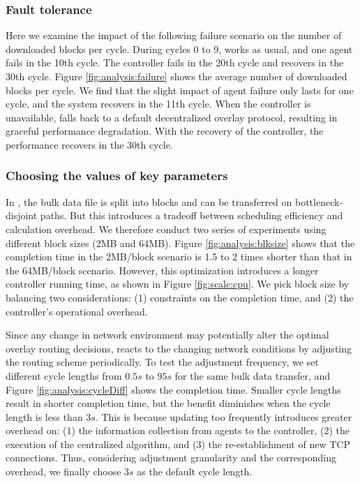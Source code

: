 \subsubsection{Fault tolerance}

Here we examine the impact of the following failure scenario on the number of downloaded blocks per cycle. During cycles 0 to 9, \name works as usual, and one agent fails in the 10th cycle. The controller fails in the 20th cycle and recovers in the 30th cycle. Figure \ref{fig:analysis:failure} shows the average number of downloaded blocks per cycle. We find that the slight impact of agent failure only lasts for one cycle, and the system recovers in the 11th cycle. When the controller is unavailable, \name falls back to a default decentralized overlay protocol, resulting in graceful performance degradation. With the recovery of the controller, the performance recovers in the 30th cycle.

\subsubsection{Choosing the values of key parameters}\label{subsec:evaluation:benchmarks:parameters}

 In \name, the bulk data file is split into blocks and can be transferred on bottleneck-disjoint paths. But this introduces a tradeoff between scheduling efficiency and calculation overhead. We therefore conduct two series of experiments using different block sizes (2MB and 64MB). Figure \ref{fig:analysis:blksize} shows that the completion time in the 2MB/block scenario is 1.5 to 2 times shorter than that in the 64MB/block scenario.
However, this optimization introduces a longer controller running time, as shown in Figure \ref{fig:scale:cpu}. We pick block size by balancing two considerations: (1) constraints on the completion time, and (2) the controller's operational overhead.

 Since any change in network environment may potentially alter the optimal overlay routing decisions, \name reacts to the changing network conditions by adjusting the routing scheme periodically. To test the adjustment frequency, we set different cycle lengths from $0.5s$ to $95s$ for the same bulk data transfer, and Figure \ref{fig:analysis:cycleDiff} shows the completion time. Smaller cycle lengths result in shorter completion time, but the benefit diminishes when the cycle length is less than $3s$. This is because updating too frequently introduces greater overhead on: (1) the information collection from agents to the controller, (2) the execution of the centralized algorithm, and (3) the re-establishment of new TCP connections. Thus, considering adjustment granularity and the corresponding overhead, we finally choose $3s$ as the default cycle length.


